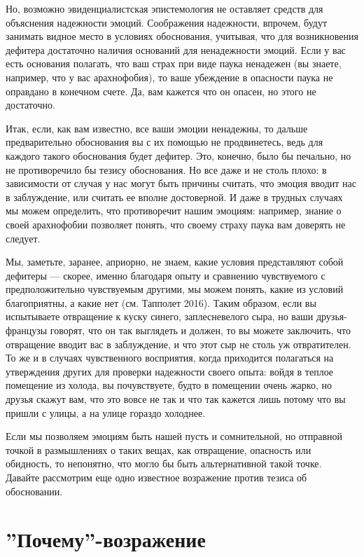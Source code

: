 \documentclass[11pt]{book}
\begin{document}
Но, возможно эвиденциалистская эпистемология не оставляет средств для объяснения надежности эмоций. Соображения надежности, впрочем, будут занимать видное место в условиях обоснования, учитывая, что для возникновения дефитера достаточно наличия оснований для ненадежности эмоций. Если у вас есть основания полагать, что ваш страх при виде паука ненадежен (вы знаете, например, что у вас арахнофобия), то ваше убеждение в опасности паука не оправдано в конечном счете. Да, вам кажется что он опасен, но этого не достаточно.

Итак, если, как вам известно, все ваши эмоции ненадежны, то дальше предварительно обоснования вы с их помощью не продвинетесь, ведь для каждого такого обоснования будет дефитер. Это, конечно, было бы печально, но не противоречило бы тезису обоснования. Но все даже и не столь плохо: в зависимости от случая у нас могут быть причины считать, что эмоция вводит нас в заблуждение, или считать ее вполне достоверной. И даже в трудных случаях мы можем определить, что противоречит нашим эмоциям: например, знание о своей арахнофобии позволяет понять, что своему страху паука вам доверять не следует.

Мы, заметьте, заранее, априорно, не знаем, какие условия представляют собой дефитеры --- скорее, именно благодаря опыту и сравнению чувствуемого с предположительно чувствуемым другими, мы можем понять, какие из условий благоприятны, а какие нет (см. Тапполет 2016). Таким образом, если вы испытываете отвращение к куску синего, заплесневелого сыра, но ваши друзья-французы говорят, что он так выглядеть и должен, то вы можете заключить, что отвращение вводит вас в заблуждение, и что этот сыр не столь уж отвратителен. То же и в случаях чувственного восприятия, когда приходится полагаться на утверждения других для проверки надежности своего опыта: войдя в теплое помещение из холода, вы почувствуете, будто в помещении очень жарко, но друзья скажут вам, что это вовсе не так и что так кажется лишь потому что вы пришли с улицы, а на улице гораздо холоднее.

Если мы позволяем эмоциям быть нашей пусть и сомнительной, но отправной точкой в размышлениях о таких вещах, как отвращение, опасность или обидность, то непонятно, что могло бы быть альтернативной такой точке. Давайте рассмотрим еще одно известное возражение против тезиса об обосновании.

\section{''Почему''-возражение}
\end{document}
